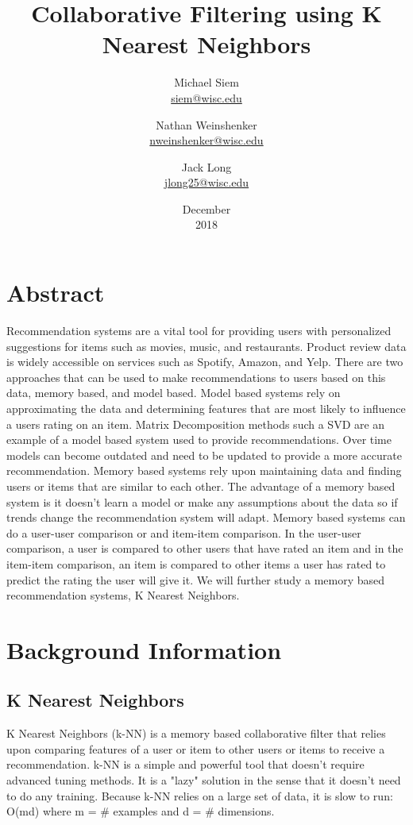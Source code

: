 \documentclass{report}
\title{Collaborative Filtering using K Nearest Neighbors}
\date{December\\ 2018}
\author{Michael Siem \\ \href{mailto:siem@wisc.edu}{siem@wisc.edu}
	\and Nathan Weinshenker \\ \href{mailto:nweinshenker@wisc.edu}{nweinshenker@wisc.edu}
	\and Jack Long \\ \href{mailto:jlong25@wisc.edu}{jlong25@wisc.edu}}
\begin{document}
\maketitle

\chapter*{Abstract}
Recommendation systems are a vital tool for providing users with personalized suggestions for items such as movies, music, and restaurants.
Product review data is widely accessible on services such as Spotify, Amazon, and Yelp.
There are two approaches that can be used to make recommendations to users based on this data, memory based, and model based.
Model based systems rely on approximating the data and determining features that are most likely to influence a users rating on an item. 
Matrix Decomposition methods such a SVD are an example of a model based system used to provide recommendations.
Over time models can become outdated and need to be updated to provide a more accurate recommendation.
Memory based systems rely upon maintaining data and finding users or items that are similar to each other.
The advantage of a memory based system is it doesn't learn a model or make any assumptions about the data so if trends change the recommendation system will adapt.
Memory based systems can do a user-user comparison or and item-item comparison.
In the user-user comparison, a user is compared to other users that have rated an item and in the item-item comparison, an item is compared to other items a user has rated to predict the rating the user will give it.
We will further study a memory based recommendation systems, K Nearest Neighbors.

\chapter*{Background Information}
	
\section*{K Nearest Neighbors}
	
K Nearest Neighbors (k-NN) is a memory based collaborative filter that relies upon comparing features of a user or item to other users or items to receive a recommendation. 
k-NN is a simple and powerful tool that doesn't require advanced tuning methods. 
It is a "lazy" solution in the sense that it doesn't need to do any training.
Because k-NN relies on a large set of data, it is slow to run: O(md) where m = \# examples and d = \# dimensions.
\end{document}
